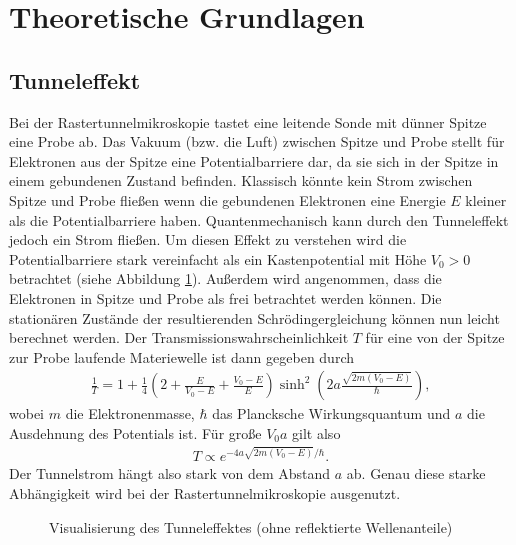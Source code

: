 \section{Theoretische Grundlagen}

\subsection{Tunneleffekt}
Bei der Rastertunnelmikroskopie tastet eine leitende Sonde mit dünner Spitze eine Probe ab. Das Vakuum (bzw. die Luft) zwischen Spitze und Probe stellt für Elektronen aus der Spitze eine Potentialbarriere dar, da sie sich in der Spitze in einem gebundenen Zustand befinden. Klassisch könnte kein Strom zwischen Spitze und Probe fließen wenn die gebundenen Elektronen eine Energie $E$ kleiner als die Potentialbarriere haben. Quantenmechanisch kann durch den Tunneleffekt jedoch ein Strom fließen. Um diesen Effekt zu verstehen wird die Potentialbarriere stark vereinfacht als ein Kastenpotential mit Höhe $V_0>0$ betrachtet (siehe Abbildung \ref{fig:tunnel}). Außerdem wird angenommen, dass die Elektronen in Spitze und Probe als frei betrachtet werden können. Die stationären Zustände der resultierenden Schrödingergleichung können nun leicht berechnet werden. Der Transmissionswahrscheinlichkeit $T$ für eine von der Spitze zur Probe laufende Materiewelle ist dann gegeben durch
\begin{align*}
  \frac{1}{T}=1+\frac{1}{4}\left( 2+\frac{E}{V_0-E} + \frac{V_0-E}{E}\right) \sinh^2\left( 2a \frac{\sqrt{2m(V_0-E)}}{\hbar} \right), 
\end{align*}
wobei $m$ die Elektronenmasse, $\hbar$ das Plancksche Wirkungsquantum und $a$ die Ausdehnung des Potentials ist.
Für große $V_0a$ gilt also
\begin{align}
  T \propto e^{-4a\sqrt{2m(V_0-E)}/\hbar}.
  \label{eq:T}
\end{align}  
Der Tunnelstrom hängt also stark von dem Abstand $a$ ab. Genau diese starke Abhängigkeit wird bei der Rastertunnelmikroskopie ausgenutzt. 


\begin{figure}[h]
  \centering
  \caption{Visualisierung des Tunneleffektes (ohne reflektierte Wellenanteile)}
  \label{fig:tunnel}
\end{figure}

